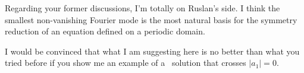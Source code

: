 \begin{description}
Regarding your former discussions, I'm totally on Ruslan's side. I think the
smallest non-vanishing Fourier mode is the most natural basis for the symmetry
reduction of an equation defined on a periodic domain.

I would be convinced that what I am suggesting here is no better than what
you tried before if you show me an example of a \KS\ solution that crosses
$|a_1| = 0$.

\end{description}
\renewcommand{\ssp}{a}

